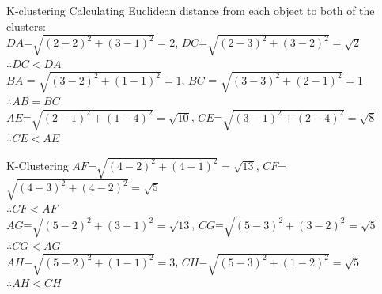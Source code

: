 \begin{frame}{K-clustering}
  Calculating Euclidean distance from each object to both of the clusters:\\
  $DA$=$\sqrt{{(2-2)}^2+{(3-1)}^2}=2$,
  $DC$=$\sqrt{{(2-3)}^2+{(3-2)}^2}=\sqrt{2}$\\
  $\therefore DC<DA$\\
  $BA$ = $\sqrt{{(3-2)}^2+{(1-1)}^2}=1$,
  $BC$ = $\sqrt{{(3-3)}^2+{(2-1)}^2}=1$\\
  $\therefore AB=BC$\\
  $AE$=$\sqrt{{(2-1)}^2+{(1-4)}^2}=\sqrt{10}$,
  $CE$=$\sqrt{{(3-1)}^2+{(2-4)}^2}=\sqrt{8}$\\
  $\therefore CE<AE$\\
\end{frame}

\begin{frame}{K-Clustering}
  $AF$=$\sqrt{{(4-2)}^2+{(4-1)}^2}=\sqrt{13}$,
  $CF$=$\sqrt{{(4-3)}^2+{(4-2)}^2}=\sqrt{5}$\\
  $\therefore CF<AF$\\
  $AG$=$\sqrt{{(5-2)}^2+{(3-1)}^2}=\sqrt{13}$,
  $CG$=$\sqrt{{(5-3)}^2+{(3-2)}^2}=\sqrt{5}$\\
  $\therefore CG<AG$\\
  $AH$=$\sqrt{{(5-2)}^2+{(1-1)}^2}=3$,
  $CH$=$\sqrt{{(5-3)}^2+{(1-2)}^2}=\sqrt{5}$\\
  $\therefore AH<CH$\\
\end{frame}
